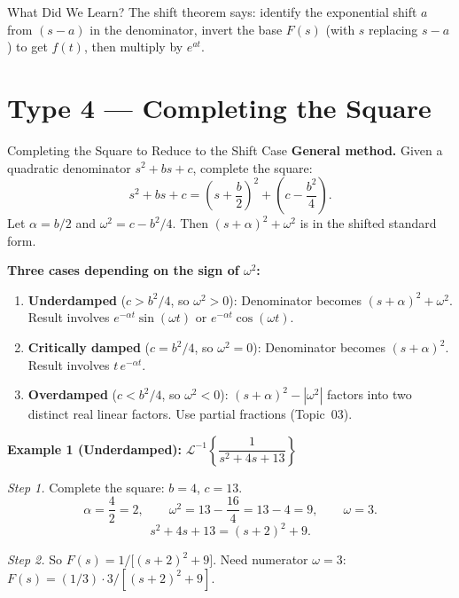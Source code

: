 \documentclass[12pt,a4paper]{article}
\begin{document}
\begin{learnbox}{What Did We Learn?}
The shift theorem says: identify the exponential shift $a$ from $(s-a)$ in the denominator,
invert the base $F(s)$ (with $s$ replacing $s-a$) to get $f(t)$, then multiply by $e^{at}$.
\end{learnbox}

\section{Type 4 --- Completing the Square}

\begin{infobox}{Completing the Square to Reduce to the Shift Case}
\textbf{General method.} Given a quadratic denominator $s^2 + bs + c$, complete the square:
\[
  s^2 + bs + c = \left(s + \frac{b}{2}\right)^2 + \left(c - \frac{b^2}{4}\right).
\]
Let $\alpha = b/2$ and $\omega^2 = c - b^2/4$.
Then $(s+\alpha)^2 + \omega^2$ is in the shifted standard form.

\medskip
\textbf{Three cases depending on the sign of $\omega^2$:}

\begin{enumerate}[leftmargin=*, label=\arabic*.]
  \item \textbf{Underdamped} ($c > b^2/4$, so $\omega^2 > 0$):
        Denominator becomes $(s+\alpha)^2 + \omega^2$. Result involves
        $e^{-\alpha t}\sin(\omega t)$ or $e^{-\alpha t}\cos(\omega t)$.

  \item \textbf{Critically damped} ($c = b^2/4$, so $\omega^2 = 0$):
        Denominator becomes $(s+\alpha)^2$. Result involves $t\,e^{-\alpha t}$.

  \item \textbf{Overdamped} ($c < b^2/4$, so $\omega^2 < 0$):
        $(s+\alpha)^2 - |\omega^2|$ factors into two distinct real linear factors.
        Use partial fractions (Topic~03).
\end{enumerate}

\medskip
\textbf{Example 1 (Underdamped):} $\mathcal{L}^{-1}\left\{\dfrac{1}{s^2+4s+13}\right\}$

\textit{Step 1.} Complete the square: $b = 4$, $c = 13$.
\[
  \alpha = \frac{4}{2} = 2, \qquad \omega^2 = 13 - \frac{16}{4} = 13 - 4 = 9,
  \qquad \omega = 3.
\]
\[
  s^2+4s+13 = (s+2)^2 + 9.
\]

\textit{Step 2.} So $F(s) = 1/\bigl[(s+2)^2+9\bigr]$.
Need numerator $\omega = 3$: $F(s) = (1/3)\cdot 3/[(s+2)^2+9]$.


\end{infobox}
\end{document}
